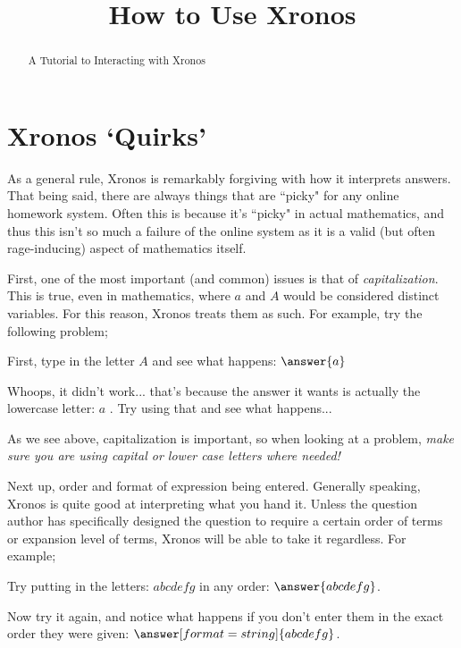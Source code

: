 \documentclass{ximera}
\title{How to Use Xronos}
\begin{document}
\begin{abstract}
A Tutorial to Interacting with Xronos
\end{abstract}
\maketitle

\section{Xronos `Quirks'}
    As a general rule, Xronos is remarkably forgiving with how it interprets answers. That being said, there are always things that are ``picky" for any online homework system. Often this is because it's ``picky" in actual mathematics, and thus this isn't so much a failure of the online system as it is a valid (but often rage-inducing) aspect of mathematics itself.
    
    First, one of the most important (and common) issues is that of \textit{capitalization}. This is true, even in mathematics, where $a$ and $A$ would be considered distinct variables. For this reason, Xronos treats them as such. For example, try the following problem;
    
    \begin{problem}
        First, type in the letter $A$ and see what happens: $\answer{a}$
        \begin{feedback}
            Whoops, it didn't work... that's because the answer it wants is actually the lowercase letter:  $a$ . Try using that and see what happens...%
        \end{feedback}
    \end{problem}
    
    As we see above, capitalization is important, so when looking at a problem, \textit{make sure you are using capital or lower case letters where needed!}
    
    Next up, order and format of expression being entered. Generally speaking, Xronos is quite good at interpreting what you hand it. Unless the question author has specifically designed the question to require a certain order of terms or expansion level of terms, Xronos will be able to take it regardless. For example;
    
    \begin{problem}
        Try putting in the letters: $abcdefg$ in any order: $\answer{abcdefg}$.
        \begin{problem}
            Now try it again, and notice what happens if you don't enter them in the exact order they were given: $\answer[format=string]{abcdefg}$.
        \end{problem}
    \end{problem}
    
\end{document}
